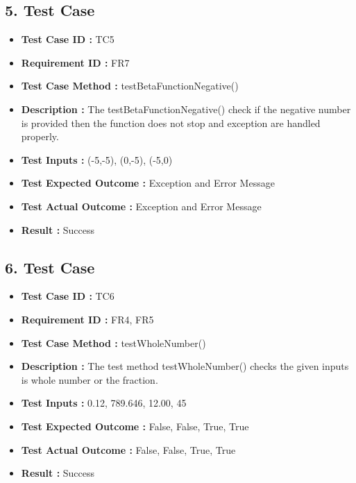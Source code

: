 \documentclass[12pt,a4paper]{report}
\begin{document}
\subsection*{5. Test Case}
    \begin{itemize}
        \item \textbf{Test Case ID : } TC5
        \item \textbf{Requirement ID : } FR7
        \item \textbf{Test Case Method : } testBetaFunctionNegative()
        \item \textbf{Description : }The testBetaFunctionNegative() check if the negative number is provided then the function does not stop and exception are handled properly. 
        \item \textbf{Test Inputs : }(-5,-5), (0,-5), (-5,0)
        \item \textbf{Test Expected Outcome : }Exception and Error Message
        \item \textbf{Test Actual Outcome : }Exception and Error Message 
        \item \textbf{Result : }Success
    \end{itemize}
    
\subsection*{6. Test Case}
    \begin{itemize}
        \item \textbf{Test Case ID : } TC6
        \item \textbf{Requirement ID : } FR4, FR5
        \item \textbf{Test Case Method : } testWholeNumber()
        \item \textbf{Description : }The test method testWholeNumber() checks the given inputs is whole number or the fraction.  
        \item \textbf{Test Inputs : }0.12, 789.646, 12.00, 45
        \item \textbf{Test Expected Outcome : }False, False, True, True
        \item \textbf{Test Actual Outcome : }False, False, True, True 
        \item \textbf{Result : }Success
    \end{itemize}
\end{document}
